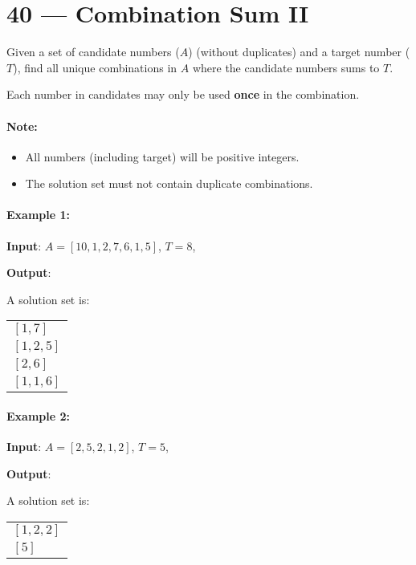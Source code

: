 \section{40 --- Combination Sum II}
Given a set of candidate numbers ($A$) (without duplicates) and a target number ($T$), find all unique combinations in $A$ where the candidate numbers sums to $T$.

Each number in candidates may only be used \textbf{once} in the combination.

\paragraph{Note:}

\begin{itemize}
\item All numbers (including target) will be positive integers.
\item The solution set must not contain duplicate combinations.
\end{itemize}

\paragraph{Example 1:}

\begin{flushleft}
\textbf{Input}: $A = [10,1,2,7,6,1,5]$, $T = 8$,

\textbf{Output}:

A solution set is:

\begin{table}[H]
\begin{tabular}{l}
$ [1, 7] $ \\
$ [1, 2, 5] $ \\
$ [2, 6] $ \\
$ [1, 1, 6] $
\end{tabular}
\end{table}

\end{flushleft}

\paragraph{Example 2:}

\begin{flushleft}
\textbf{Input}: $A = [2,5,2,1,2]$, $T = 5$,

\textbf{Output}:

A solution set is:

\begin{table}[H]
\begin{tabular}{l}
$[1,2,2]$ \\
$[5]$ 
\end{tabular}
\end{table}
\end{flushleft}

